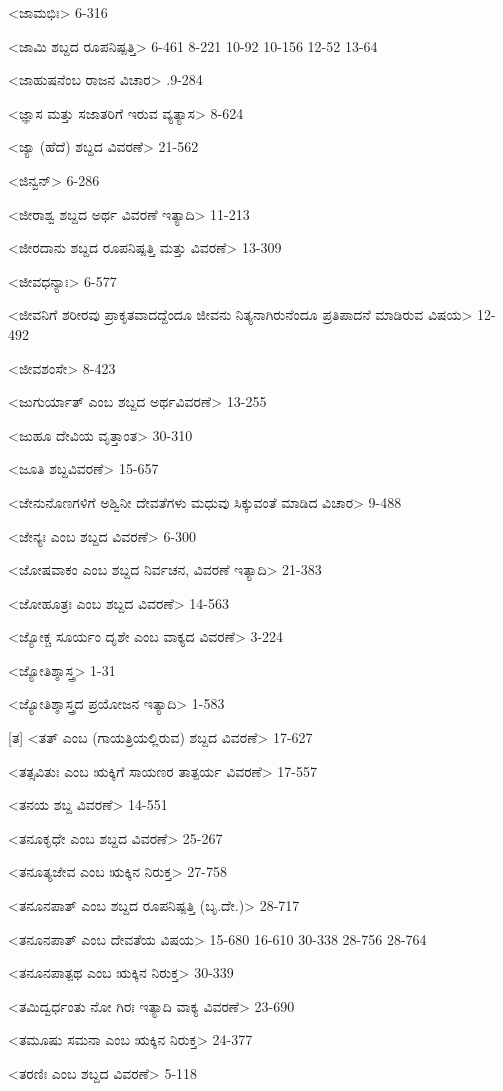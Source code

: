 <ಜಾಮಭಿಃ>
6-316

<ಜಾಮಿ ಶಬ್ದದ ರೂಪನಿಷ್ಪತ್ತಿ>
6-461 
8-221 
10-92 
10-156 
12-52
13-64

<ಜಾಹುಷನೆಂಬ ರಾಜನ ವಿಚಾರ>
.9-284

<ಜ್ಞಾಸ ಮತ್ತು ಸಜಾತರಿಗೆ ಇರುವ ವ್ಯತ್ಯಾಸ>
8-624

<ಜ್ಯಾ (ಹೆದೆ) ಶಬ್ದದ ವಿವರಣೆ>
21-562

<ಜಿನ್ವನ್‍>
6-286

<ಜೀರಾಶ್ವ ಶಬ್ದದ ಅರ್ಥ ವಿವರಣೆ ಇತ್ಯಾದಿ>
11-213

<ಜೀರದಾನು ಶಬ್ದದ ರೂಪನಿಷ್ಪತ್ತಿ ಮತ್ತು ವಿವರಣೆ>
13-309

<ಜೀವಧನ್ಯಾಃ>
6-577

<ಜೀವನಿಗೆ ಶರೀರವು ಪ್ರಾಕೃತವಾದದ್ದೆಂದೂ ಜೀವನು ನಿತ್ಯನಾಗಿರುನೆಂದೂ ಪ್ರತಿಪಾದನೆ ಮಾಡಿರುವ ವಿಷಯ>
12-492

<ಜೀವಶಂಸೇ>
8-423

<ಜುಗುರ್ಯಾತ್‍ ಎಂಬ ಶಬ್ದದ ಅರ್ಥವಿವರಣೆ>
13-255

<ಜುಹೂ ದೇವಿಯ ವೃತ್ತಾಂತ>
30-310

<ಜೂತಿ ಶಬ್ದವಿವರಣೆ>
15-657

<ಜೇನುನೊಣಗಳಿಗೆ ಅಶ್ವಿನೀ ದೇವತೆಗಳು ಮಧುವು ಸಿಕ್ಕುವಂತೆ ಮಾಡಿದ ವಿಚಾರ>
9-488

<ಜೇನ್ಯಃ ಎಂಬ ಶಬ್ದದ ವಿವರಣೆ>
6-300

<ಜೋಷವಾಕಂ ಎಂಬ ಶಬ್ದದ ನಿರ್ವಚನ, ವಿವರಣೆ ಇತ್ಯಾದಿ>
21-383

<ಜೋಹೂತ್ರಃ ಎಂಬ ಶಬ್ದದ ವಿವರಣೆ>
14-563

<ಜ್ಯೋಕ್ಚ ಸೂರ್ಯಂ ದೃಶೇ ಎಂಬ ವಾಕ್ಯದ ವಿವರಣೆ>
3-224

<ಜ್ಯೋತಿಶ್ಶಾಸ್ತ್ರ>
1-31

<ಜ್ಯೋತಿಶ್ಶಾಸ್ತ್ರದ ಪ್ರಯೋಜನ ಇತ್ಯಾದಿ>
1-583

[ತ]
<ತತ್‍ ಎಂಬ (ಗಾಯತ್ರಿಯಲ್ಲಿರುವ) ಶಬ್ದದ ವಿವರಣೆ>
17-627

<ತತ್ಸವಿತುಃ ಎಂಬ ಋಕ್ಕಿಗೆ ಸಾಯಣರ ತಾತ್ಪರ್ಯ ವಿವರಣೆ>
17-557

<ತನಯ ಶಬ್ದ ವಿವರಣೆ>
14-551

<ತನೂಕೃಧೇ ಎಂಬ ಶಬ್ದದ ವಿವರಣೆ>
25-267

<ತನೂತ್ಯಜೇವ ಎಂಬ ಋಕ್ಕಿನ ನಿರುಕ್ತ>
27-758

<ತನೂನಪಾತ್‍ ಎಂಬ ಶಬ್ದದ ರೂಪನಿಷ್ಪತ್ತಿ (ಬೃ.ದೇ.)>
28-717

<ತನೂನಪಾತ್‍ ಎಂಬ ದೇವತೆಯ ವಿಷಯ>
15-680
16-610 
30-338
28-756
28-764

<ತನೂನಪಾತ್ಪಥ ಎಂಬ ಋಕ್ಕಿನ ನಿರುಕ್ತ>
30-339

<ತಮಿದ್ವರ್ಧಂತು ನೋ ಗಿರಃ ಇತ್ಯಾದಿ ವಾಕ್ಯ ವಿವರಣೆ>
23-690

<ತಮೂಷು ಸಮನಾ ಎಂಬ ಋಕ್ಕಿನ ನಿರುಕ್ತ>
24-377

<ತರಣಿಃ ಎಂಬ ಶಬ್ದದ ವಿವರಣೆ>
5-118

